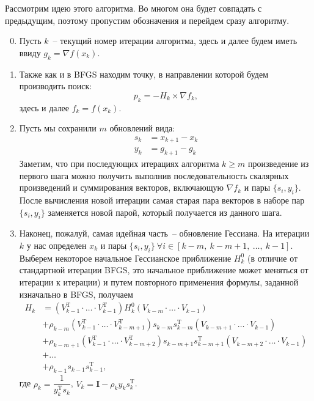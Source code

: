 \documentclass[12pt, a4paper, oneside, final]{article}
\begin{document}
	Рассмотрим идею этого алгоритма.
	Во многом она будет совпадать с предыдущим, поэтому пропустим обозначения и перейдем сразу алгоритму.
	\begin{enumerate}[1)]
		\setcounter{enumi}{-1}
		\item Пусть $k$~-- текущий номер итерации алгоритма, здесь и далее будем иметь ввиду $g_{k} = \nabla{f(x_{k})}$.
		\item Также как и в BFGS находим точку, в направлении которой будем производить поиск:
		\[
			p_{k} = -H_{k} \times \nabla{f_{k}},
		\] здесь и далее $f_{k} = f(x_{k})$.
		\item Пусть мы сохранили $m$ обновлений вида:
		\begin{align*}
			s_{k} &= x_{k + 1} - x_{k} \\
			y_{k} &= g_{k + 1} - g_{k}
		\end{align*}
		Заметим, что при последующих итерациях алгоритма $k \geqslant m$ произведение из первого шага можно получить выполнив последовательность скалярных произведений и суммирования векторов, включающую $\nabla{f_{k}}$ и пары $\{s_{i}, y_{i}\}$.
		После вычисления новой итерации самая старая пара векторов в наборе пар $\{s_{i}, y_{i}\}$ заменяется новой парой, который получается из данного шага.
		\item Наконец, пожалуй, самая идейная часть~-- обновление Гессиана.
		На итерации $k$ у нас определен $x_{k}$ и пары $\{s_{i}, y_{i}\}~\forall i \in [k - m, ~ k - m + 1, ~ \ldots, ~ k - 1]$.
		Выберем некоторое начальное Гессианское приближение $H_{k}^{0}$ (в отличие от стандартной итерации BFGS, это начальное приближение может меняться от итерации к итерации) и путем повторного применения формулы, заданной изначально в BFGS, получаем
		\begin{align*}
			H_{k} &= (V_{k - 1}^{\mathrm{T}} \cdot \ldots \cdot V_{k - 1}^{\mathrm{T}}) H_{k}^{0} (V_{k - m} \cdot \ldots \cdot V_{k - 1}) \\
			&+ \rho_{k - m}(V_{k - 1}^{\mathrm{T}} \cdot \ldots \cdot V_{k - m + 1}^{\mathrm{T}})s_{k - m}s_{k - m}^{\mathrm{T}}(V_{k - m + 1} \cdot \ldots \cdot V_{k - 1}) \\
			&+ \rho_{k - m + 1}(V_{k - 1}^{\mathrm{T}} \cdot \ldots \cdot V_{k - m + 2}^{\mathrm{T}})s_{k - m + 1}s_{k - m + 1}^{\mathrm{T}}(V_{k - m + 2} \cdot \ldots \cdot V_{k - 1}) \\
			&+ \ldots \\
			&+ \rho_{k - 1}s_{k - 1}s_{k - 1}^{\mathrm{T}},
		\end{align*} где $\rho_{k} = \dfrac{1}{y^{\mathrm{T}}_{k}s_{k}}$, $V_{k} = \mathbf{I} - \rho_{k}y_{k}s_{k}^{\mathrm{T}}$.

\end{enumerate}
\end{document}
